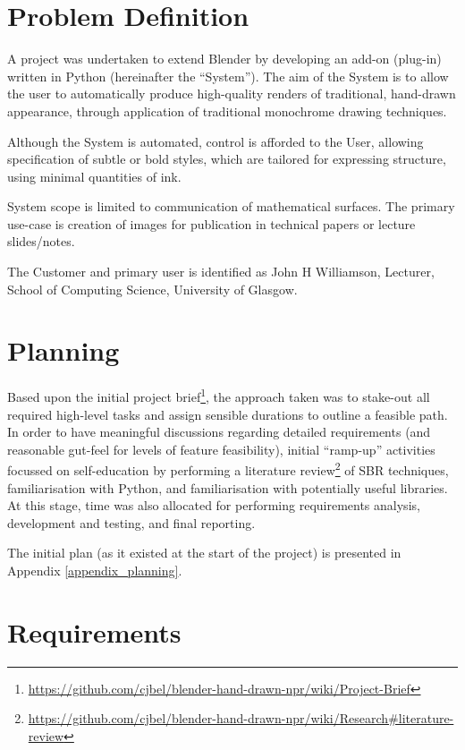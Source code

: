 \section{Problem Definition}

A project was undertaken to extend Blender by developing an add-on (plug-in) written in Python (hereinafter the ``System''). The aim of the System is to allow the user to automatically produce high-quality renders of traditional, hand-drawn appearance, through application of traditional monochrome drawing techniques.

Although the System is automated, control is afforded to the User, allowing specification of subtle or bold styles, which are tailored for expressing structure, using minimal quantities of ink.

System scope is limited to communication of mathematical surfaces. The primary use-case is creation of images for publication in technical papers or lecture slides/notes.

The Customer and primary user is identified as John H Williamson, Lecturer, School of Computing Science, University of Glasgow.

\section{Planning}

Based upon the initial project brief\footnote{\url{https://github.com/cjbel/blender-hand-drawn-npr/wiki/Project-Brief}}, the approach taken was to stake-out all required high-level tasks and assign sensible durations to outline a feasible path. 
In order to have meaningful discussions regarding detailed requirements (and reasonable gut-feel for levels of feature feasibility), initial ``ramp-up'' activities focussed on self-education by performing a literature review\footnote{\url{https://github.com/cjbel/blender-hand-drawn-npr/wiki/Research#literature-review}} of SBR techniques, familiarisation with Python, and familiarisation with potentially useful libraries.
At this stage, time was also allocated for performing requirements analysis, development and testing, and final reporting.

The initial plan (as it existed at the start of the project) is presented in Appendix \ref{appendix_planning}.

\section{Requirements}

